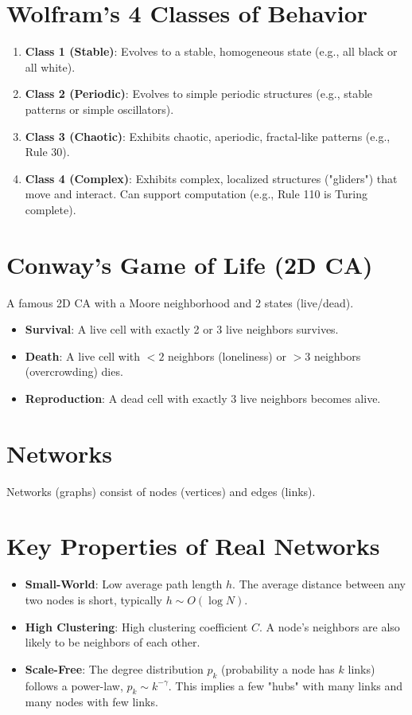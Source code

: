 \documentclass[8pt,a4paper,twocolumn]{article}
\newcommand{\0}{\mathbf{0}}
\begin{document}
\section*{Wolfram's 4 Classes of Behavior}
\begin{enumerate}
    \item \textbf{Class 1 (Stable)}: Evolves to a stable, homogeneous state (e.g., all black or all white).
    \item \textbf{Class 2 (Periodic)}: Evolves to simple periodic structures (e.g., stable patterns or simple oscillators).
    \item \textbf{Class 3 (Chaotic)}: Exhibits chaotic, aperiodic, fractal-like patterns (e.g., Rule 30).
    \item \textbf{Class 4 (Complex)}: Exhibits complex, localized structures ("gliders") that move and interact. Can support computation (e.g., Rule 110 is Turing complete).
\end{enumerate}

\section*{Conway's Game of Life (2D CA)}
A famous 2D CA with a Moore neighborhood and 2 states (live/dead).
\begin{itemize}
    \item \textbf{Survival}: A live cell with exactly 2 or 3 live neighbors survives.
    \item \textbf{Death}: A live cell with $<2$ neighbors (loneliness) or $>3$ neighbors (overcrowding) dies.
    \item \textbf{Reproduction}: A dead cell with exactly 3 live neighbors becomes alive.
\end{itemize}

\section*{Networks}
Networks (graphs) consist of nodes (vertices) and edges (links).

\section*{Key Properties of Real Networks}
\begin{itemize}
    \item \textbf{Small-World}: Low average path length $h$. The average distance between any two nodes is short, typically $h \sim O(\log N)$.
    \item \textbf{High Clustering}: High clustering coefficient $C$. A node's neighbors are also likely to be neighbors of each other.
    \item \textbf{Scale-Free}: The degree distribution $p_k$ (probability a node has $k$ links) follows a power-law, $p_k \sim k^{-\gamma}$. This implies a few "hubs" with many links and many nodes with few links.
\end{itemize}
\end{document}
